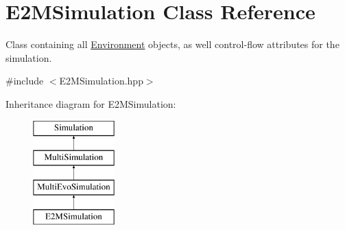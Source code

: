 \hypertarget{classE2MSimulation}{}\section{E2\+M\+Simulation Class Reference}
\label{classE2MSimulation}


Class containing all \hyperlink{classEnvironment}{Environment} objects, as well control-\/flow attributes for the simulation.  




{\ttfamily \#include $<$E2\+M\+Simulation.\+hpp$>$}

Inheritance diagram for E2\+M\+Simulation\+:\begin{figure}[H]
\begin{center}
\leavevmode
\includegraphics[height=4.000000cm]{classE2MSimulation}
\end{center}
\end{figure}
